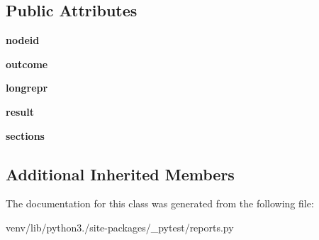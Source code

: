 \subsection*{Public Attributes}
\begin{DoxyCompactItemize}
\item 
\mbox{\label{class__pytest_1_1reports_1_1_collect_report_a1f046db417b924751935f75a064ed5ca}} 
{\bfseries nodeid}
\item 
\mbox{\label{class__pytest_1_1reports_1_1_collect_report_a4b82ecb61b1f106e325aa659b5a6a1f9}} 
{\bfseries outcome}
\item 
\mbox{\label{class__pytest_1_1reports_1_1_collect_report_ac003d030a9337574c406ce158336a73c}} 
{\bfseries longrepr}
\item 
\mbox{\label{class__pytest_1_1reports_1_1_collect_report_a47371f651b4ef50fce372b89c0de3c23}} 
{\bfseries result}
\item 
\mbox{\label{class__pytest_1_1reports_1_1_collect_report_a6e53d6c4e613c0aac2ad2dc376668c62}} 
{\bfseries sections}
\end{DoxyCompactItemize}
\subsection*{Additional Inherited Members}


The documentation for this class was generated from the following file\+:\begin{DoxyCompactItemize}
\item 
venv/lib/python3./site-\/packages/\+\_\+pytest/reports.\+py\end{DoxyCompactItemize}
